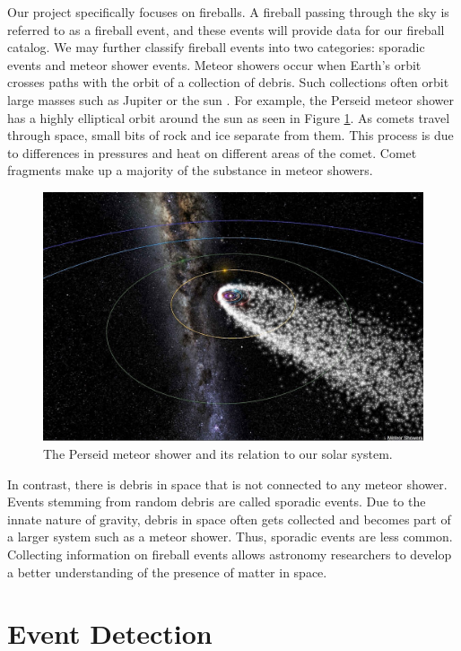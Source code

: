 Our project specifically focuses on fireballs.
A fireball passing through the sky is referred to as a fireball event, and these events will provide data for our fireball catalog.
We may further classify fireball events into two categories: sporadic events and meteor shower events.
Meteor showers occur when Earth's orbit crosses paths with the orbit of a collection of debris. 
Such collections often orbit large masses such as Jupiter or the sun \cite{trigo-rodriguez_2006_2007}.  
For example, the Perseid meteor shower has a highly elliptical orbit around the sun as seen in Figure \ref{perceid}.  
As comets travel through space, small bits of rock and ice separate from them.
This process is due to differences in pressures and heat on different areas of the comet.
Comet fragments make up a majority of the substance in meteor showers.

\begin{figure}[ht!]
  \centering
  \includegraphics[scale=1]{images/persiod_shower.jpg}
  \caption{The Perseid meteor shower and its relation to our solar system.}
  \label{perceid}
\end{figure}

In contrast, there is debris in space that is not connected to any meteor shower. 
Events stemming from random debris are called sporadic events.
Due to the innate nature of gravity, debris in space often gets collected and becomes part of a larger system such as a meteor shower.
Thus, sporadic events are less common.
Collecting information on fireball events allows astronomy researchers to develop a better understanding of the presence of matter in space. %


\section{Event Detection}

